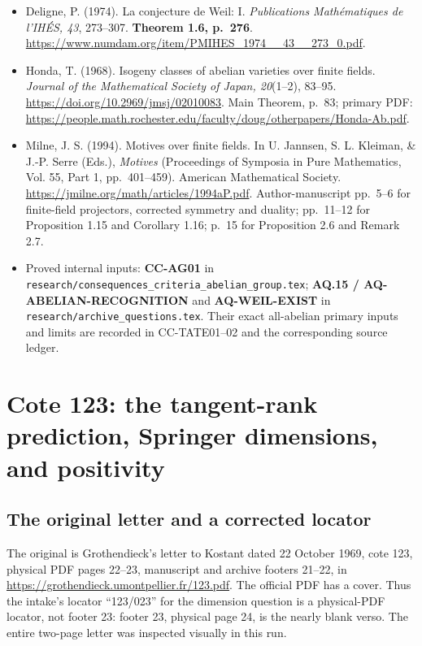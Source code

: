\documentclass[11pt,a4paper]{article}
\providecommand{\tightlist}{\setlength{\itemsep}{0pt}\setlength{\parskip}{0pt}}
\theoremstyle{definition}\newtheorem{definition}[theorem]{Definition}
\theoremstyle{remark}\newtheorem{remark}[theorem]{Remark}
\begin{document}
\begin{itemize}
\tightlist
\item
  Deligne, P. (1974). La conjecture de Weil: I. \emph{Publications
  Mathématiques de l'IHÉS, 43}, 273--307. \textbf{Theorem 1.6, p.~276}.
  \url{https://www.numdam.org/item/PMIHES\_1974\_\_43\_\_273\_0.pdf}.
\item
  Honda, T. (1968). Isogeny classes of abelian varieties over finite
  fields. \emph{Journal of the Mathematical Society of Japan, 20}(1--2),
  83--95. \url{https://doi.org/10.2969/jmsj/02010083}. Main Theorem, p.~83;
  primary PDF:
  \url{https://people.math.rochester.edu/faculty/doug/otherpapers/Honda-Ab.pdf}.
\item
  Milne, J. S. (1994). Motives over finite fields. In U. Jannsen, S. L.
  Kleiman, \& J.-P. Serre (Eds.), \emph{Motives} (Proceedings of
  Symposia in Pure Mathematics, Vol. 55, Part 1, pp.~401--459). American
  Mathematical Society. \url{https://jmilne.org/math/articles/1994aP.pdf}.
  Author-manuscript pp.~5--6 for finite-field projectors, corrected
  symmetry and duality; pp.~11--12 for Proposition 1.15 and Corollary
  1.16; p.~15 for Proposition 2.6 and Remark 2.7.
\item
  Proved internal inputs: \textbf{CC-AG01} in
  \nolinkurl{research/consequences_criteria_abelian_group.tex};
  \textbf{AQ.15 / AQ-ABELIAN-RECOGNITION} and \textbf{AQ-WEIL-EXIST} in
  \nolinkurl{research/archive_questions.tex}. Their exact all-abelian primary
  inputs and limits are recorded in CC-TATE01--02 and the corresponding
  source ledger.
\end{itemize}


\section{Cote 123: the tangent-rank prediction, Springer dimensions, and positivity}
\label{sec:cote123}

\subsection{The original letter and a corrected locator}
The original is Grothendieck's letter to Kostant dated 22 October 1969,
cote 123, physical PDF pages 22--23, manuscript and archive footers
21--22, in \url{https://grothendieck.umontpellier.fr/123.pdf}.
The official PDF has a cover. Thus the intake's locator ``123/023''
for the dimension question is a physical-PDF locator, not footer 23:
footer 23, physical page 24, is the nearly blank verso.
The entire two-page letter was inspected visually in this run.
\end{document}
